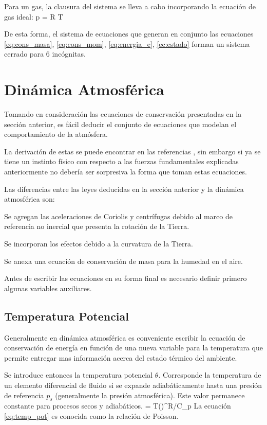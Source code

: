Para un gas, la clausura del sistema se lleva a cabo incorporando la ecuación de gas ideal:
\be \label{eq:gas_ideal}
p = \rho R T
\ee

De esta forma, el sistema de ecuaciones que generan en conjunto las ecuaciones \ref{eq:cons_masa}, \ref{eq:cons_mom}, \ref{eq:energia_e}, \ref{ec:estado} forman un sistema cerrado para 6 incógnitas.
\newpage
\section{Dinámica Atmosférica}
Tomando en consideración las ecuaciones de conservación presentadas en la sección anterior, es fácil deducir el conjunto de ecuaciones que modelan el comportamiento de la atmósfera. 

La derivación de estas se puede encontrar en las referencias \cite{holton1992introduction} \cite{jacobson2005fundamentals}, sin embargo si ya se tiene un instinto físico con respecto a las fuerzas fundamentales explicadas anteriormente no debería ser sorpresiva la forma que toman estas ecuaciones. 

Las diferencias entre las leyes deducidas en la sección anterior y la dinámica atmosférica son:
\begin{enumerate*}
	\item Se agregan las aceleraciones de Coriolis y centrífugas debido al marco de referencia no inercial que presenta la rotación de la Tierra.
	\item Se incorporan los efectos debido a la curvatura de la Tierra.
	\item Se anexa una ecuación de conservación de masa para la humedad en el aire.
\end{enumerate*}

Antes de escribir las ecuaciones en su forma final es necesario definir primero algunas variables auxiliares.
\subsection{Temperatura Potencial}
Generalmente en dinámica atmosférica es conveniente escribir la ecuación de conservación de energía en función de una nueva variable para la temperatura que permite entregar mas información acerca del estado térmico del ambiente. 

Se introduce entonces la temperatura potencial $\theta$. Corresponde la temperatura de un elemento diferencial de fluido si se expande adiabáticamente hasta una presión de referencia $p_s$ (generalmente la presión atmosférica). Este valor permanece constante para procesos secos y adiabáticos.
\be \label{eq:temp_pot}
\theta = T\left(\right)^{R/C_p}
\ee 
La ecuación \ref{eq:temp_pot} es conocida como la relación de Poisson.
